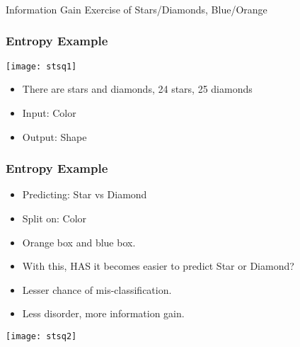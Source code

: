 \begin{frame}[fragile]\frametitle{}
\begin{center}
{\Large Information Gain Exercise of Stars/Diamonds, Blue/Orange}
\end{center}
\end{frame}


\begin{frame}[fragile]\frametitle{Entropy Example}
\begin{center}
\texttt{[image: stsq1]}
\end{center}
\begin{itemize}
\item There are stars and diamonds, 24 stars, 25 diamonds
\item Input: Color
\item Output: Shape
\end{itemize}
\end{frame}


\begin{frame}[fragile]\frametitle{Entropy Example}

\begin{itemize}
\item Predicting: Star vs Diamond
\item Split on: Color
\item Orange box and blue box.
\item With this, HAS it becomes easier to predict Star or Diamond?
\item Lesser chance of mis-classification. 
\item Less disorder, more information gain.
\end{itemize}
\begin{center}
\texttt{[image: stsq2]}
\end{center}
\end{frame}


